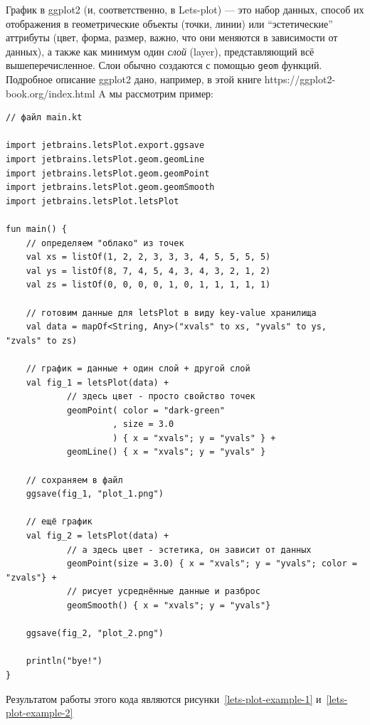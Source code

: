 \documentclass{book}
\begin{document}
График в ggplot2 (и, соответственно, в Lets-plot) --- это набор данных, способ их отображения в
геометрические объекты (точки, линии) или ``эстетические'' аттрибуты (цвет, форма, размер, важно,
что они меняются в зависимости от данных), а также как минимум один \textit{слой} (layer),
представляющий всё вышеперечисленное. Слои обычно создаются с помощью
\texttt{geom} функций. Подробное описание ggplot2 дано, например, в этой книге
https://ggplot2-book.org/index.html A мы рассмотрим пример:
\begin{verbatim}
// файл main.kt

import jetbrains.letsPlot.export.ggsave
import jetbrains.letsPlot.geom.geomLine
import jetbrains.letsPlot.geom.geomPoint
import jetbrains.letsPlot.geom.geomSmooth
import jetbrains.letsPlot.letsPlot

fun main() {
    // определяем "облако" из точек
    val xs = listOf(1, 2, 2, 3, 3, 3, 4, 5, 5, 5, 5)
    val ys = listOf(8, 7, 4, 5, 4, 3, 4, 3, 2, 1, 2)
    val zs = listOf(0, 0, 0, 0, 1, 0, 1, 1, 1, 1, 1)

    // готовим данные для letsPlot в виду key-value хранилища
    val data = mapOf<String, Any>("xvals" to xs, "yvals" to ys, "zvals" to zs)

    // график = данные + один слой + другой слой
    val fig_1 = letsPlot(data) +
            // здесь цвет - просто свойство точек
            geomPoint( color = "dark-green"
                     , size = 3.0
                     ) { x = "xvals"; y = "yvals" } +
            geomLine() { x = "xvals"; y = "yvals" }

    // сохраняем в файл
    ggsave(fig_1, "plot_1.png")

    // ещё график
    val fig_2 = letsPlot(data) +
            // а здесь цвет - эстетика, он зависит от данных
            geomPoint(size = 3.0) { x = "xvals"; y = "yvals"; color = "zvals"} +
            // рисует усреднённые данные и разброс
            geomSmooth() { x = "xvals"; y = "yvals"}

    ggsave(fig_2, "plot_2.png")

    println("bye!")
}
\end{verbatim}
Результатом работы этого кода являются рисунки~\ref{lets-plot-example-1}
и~\ref{lets-plot-example-2}
\end{document}
